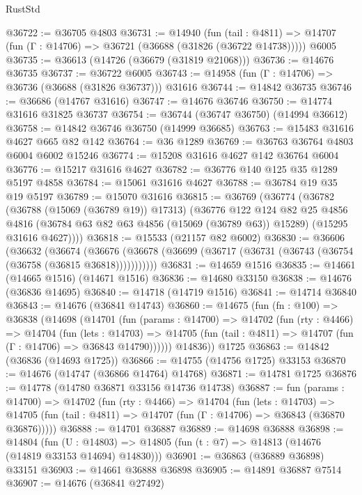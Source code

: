 \begin{lexlean}{RustStd}
\begin{coremodule}
@36722 := @36705 @4803
@36731 := @14940
    (fun (tail : @4811) => @14707 (fun (Γ : @14706) => @36721 (@36688 (@31826 (@36722 @14738)))))
    @6005
@36735 := @36613 (@14726 (@36679 (@31819 @21068)))
@36736 := @14676 @36735
@36737 := @36722 @6005
@36743 := @14958 (fun (Γ : @14706) => @36736 (@36688 (@31826 @36737))) @31616
@36744 := @14842 @36735
@36746 := @36686 (@14767 @31616)
@36747 := @14676 @36746
@36750 := @14774 @31616 @31825 @36737
@36754 := @36744 (@36747 @36750) (@14994 @36612)
@36758 := @14842 @36746 @36750 (@14999 @36685)
@36763 := @15483 @31616 @4627 @665 @82 @142
@36764 := @36 @1289
@36769 := @36763 @36764 @4803 @6004 @6002 @15246
@36774 := @15208 @31616 @4627 @142 @36764 @6004
@36776 := @15217 @31616 @4627
@36782 := @36776 @140 @125 @35 @1289 @5197 @4858
@36784 := @15061 @31616 @4627
@36788 := @36784 @19 @35 @19 @5197
@36789 := @15070 @31616
@36815 := @36769
    (@36774
      (@36782
        (@36788 (@15069 (@36789 @19)) @17313)
        (@36776
          @122
          @124
          @82
          @25
          @4856
          @4816
          (@36784 @63 @82 @63 @4856 (@15069 (@36789 @63)) @15289)
          (@15295 @31616 @4627))))
@36818 := @15533 (@21157 @82 @6002)
@36830 := @36606
    (@36632
      (@36674
        (@36676 (@36678 (@36699 (@36717 (@36731 (@36743 (@36754 (@36758 (@36815 @36818)))))))))))
@36831 := @14659 @1516
@36835 := @14661 (@14665 @1516) (@14671 @1516)
@36836 := @14680 @33150
@36838 := @14676 (@36836 @14695)
@36840 := @14718 (@14719 @1516)
@36841 := @14714 @36840
@36843 := @14676 (@36841 @14743)
@36860 := @14675
    (fun (fn : @100) =>
    @36838
      (@14698
        (@14701
          (fun (params : @14700) =>
          @14702
            (fun (rty : @4466) =>
            @14704
              (fun (lets : @14703) =>
              @14705 (fun (tail : @4811) => @14707 (fun (Γ : @14706) => @36843 @14790))))))
        @14836))
    @1725
@36863 := @14842 (@36836 (@14693 @1725))
@36866 := @14755 (@14756 @1725) @33153
@36870 := @14676 (@14747 (@36866 @14764) @14768)
@36871 := @14781 @1725
@36876 := @14778 (@14780 @36871 @33156 @14736 @14738)
@36887 := fun (params : @14700) =>
  @14702
    (fun (rty : @4466) =>
    @14704
      (fun (lets : @14703) =>
      @14705 (fun (tail : @4811) => @14707 (fun (Γ : @14706) => @36843 (@36870 @36876)))))
@36888 := @14701 @36887
@36889 := @14698 @36888
@36898 := @14804
    (fun (U : @14803) => @14805 (fun (t : @7) => @14813 (@14676 (@14819 @33153 @14694) @14830)))
@36901 := @36863 (@36889 @36898) @33151
@36903 := @14661 @36888 @36898
@36905 := @14891 @36887 @7514
@36907 := @14676 (@36841 @27492)

\end{coremodule}
\end{lexlean}
